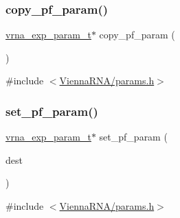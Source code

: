 \subsubsection{\texorpdfstring{copy\+\_\+pf\+\_\+param()}{copy\_pf\_param()}}
{\footnotesize\ttfamily \mbox{\hyperlink{group__energy__parameters_ga01d8b92fe734df8d79a6169482c7d8d8}{vrna\+\_\+exp\+\_\+param\+\_\+t}}$\ast$ copy\+\_\+pf\+\_\+param (\begin{DoxyParamCaption}\item[{void}]{ }\end{DoxyParamCaption})}



{\ttfamily \#include $<$\mbox{\hyperlink{params_8h}{Vienna\+R\+N\+A/params.\+h}}$>$}

\mbox{\label{group__energy__parameters_ga106a2beb5026a25bfa90fd59b8b1d5b7}} 
\subsubsection{\texorpdfstring{set\+\_\+pf\+\_\+param()}{set\_pf\_param()}}
{\footnotesize\ttfamily \mbox{\hyperlink{group__energy__parameters_ga01d8b92fe734df8d79a6169482c7d8d8}{vrna\+\_\+exp\+\_\+param\+\_\+t}}$\ast$ set\+\_\+pf\+\_\+param (\begin{DoxyParamCaption}\item[{\mbox{\hyperlink{group__energy__parameters_ga8a69ca7d787e4fd6079914f5343a1f35}{vrna\+\_\+param\+\_\+t}} $\ast$}]{dest }\end{DoxyParamCaption})}



{\ttfamily \#include $<$\mbox{\hyperlink{params_8h}{Vienna\+R\+N\+A/params.\+h}}$>$}

